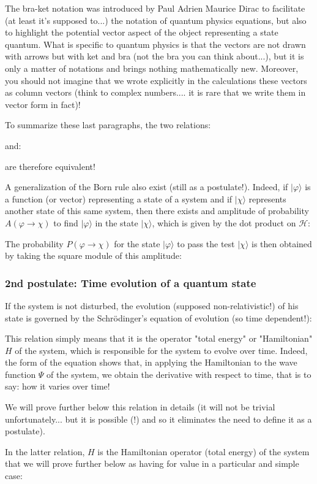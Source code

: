 	
	
	\begin{tcolorbox}[title=Remark,colframe=black,arc=10pt]
	The bra-ket notation was introduced by Paul Adrien Maurice Dirac to facilitate (at least it's supposed to...) the notation of quantum physics equations, but also to highlight the potential vector aspect of the object representing a state quantum. What is specific to quantum physics is that the vectors are not drawn with arrows but with ket and bra (not the bra you can think about...), but it is only a matter of notations and brings nothing mathematically new. Moreover, you should not imagine that we wrote explicitly in the calculations these vectors as column vectors (think to complex numbers.... it is rare that we write them in vector form in fact)!
	\end{tcolorbox}
	
	To summarize these last paragraphs, the two relations:
	
	and:
	
	are therefore equivalent!
	
	A generalization of the Born rule also exist (still as a postulate!). Indeed, if $|\varphi\rangle$ is a function (or vector) representing a state of a system and if $|\chi\rangle$ represents another state of this same system, then there exists and amplitude of probability\label{amplitude of probability} $A(\varphi\rightarrow \chi)$ to find $|\varphi\rangle$ in the state $|\chi\rangle$, which is given by the dot product on $\mathcal{H}$:
	
	The probability $P(\varphi\rightarrow \chi)$ for the state $|\varphi\rangle$ to pass the test $|\chi\rangle$ is then obtained by taking the square module of this amplitude:
	
	
	\subsubsection{2nd postulate: Time evolution of a quantum state}
	If the system is not disturbed, the evolution (supposed non-relativistic!) of his state is governed by the Schrödinger's equation of evolution (so time dependent!):
	
	This relation simply means that it is the operator "total energy" or "Hamiltonian" $H$ of the system, which is responsible for the system to evolve over time. Indeed, the form of the equation shows that, in applying the Hamiltonian to the wave function $\Psi$ of the system, we obtain the derivative with respect to time, that is to say: how it varies over time!
	\begin{tcolorbox}[title=Remark,colframe=black,arc=10pt]
	We will prove further below this relation in details (it will not be trivial unfortunately... but it is possible (!) and so it eliminates the need to define it as a postulate).
	\end{tcolorbox}
	In the latter relation, $H$ is the Hamiltonian operator (total energy) of the system that we will prove further below as having for value in a particular and simple case\label{hamiltonian operator wave quantum physics}:
	
